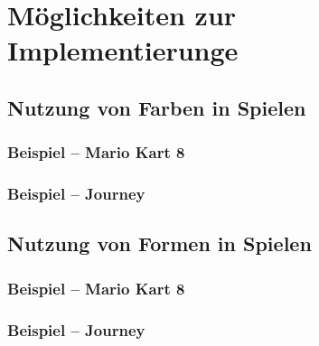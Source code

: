 \chapter{Möglichkeiten zur Implementierunge}
\label{cha:sa_Einleitung}

\section{Nutzung von Farben in Spielen}

\subsection{Beispiel – Mario Kart 8}

\subsection{Beispiel – Journey}


\section{Nutzung von Formen in Spielen}

\subsection{Beispiel – Mario Kart 8}

\subsection{Beispiel – Journey}



